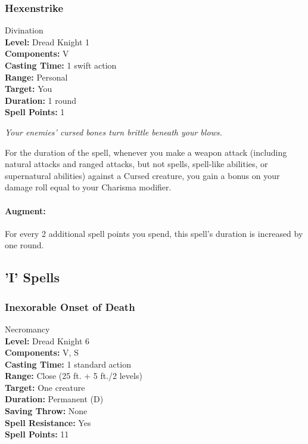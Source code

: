 \subsubsection{Hexenstrike}
\label{Spell:Hexenstrike}
Divination
\\ \textbf{Level:} Dread Knight 1
\\ \textbf{Components:} V
\\ \textbf{Casting Time:} 1 swift action
\\ \textbf{Range:} Personal
\\ \textbf{Target:} You
\\ \textbf{Duration:} 1 round
\\ \textbf{Spell Points:} 1

\emph{Your enemies' cursed bones turn brittle beneath your blows.}

For the duration of the spell, whenever you make a weapon attack (including natural attacks and ranged attacks, but not spells, spell-like abilities, or supernatural abilities) against a Cursed creature, you gain a bonus on your damage roll equal to your Charisma modifier.

\paragraph{Augment:} For every 2 additional spell points you spend, this spell's duration is increased by one round.

\subsection{'I' Spells}

\subsubsection{Inexorable Onset of Death}
\label{Spell:InexorableOnsetOfDeath}
Necromancy
\\ \textbf{Level:} Dread Knight 6
\\ \textbf{Components:} V, S
\\ \textbf{Casting Time:} 1 standard action
\\ \textbf{Range:} Close (25 ft. + 5 ft./2 levels)
\\ \textbf{Target:} One creature
\\ \textbf{Duration:} Permanent (D)
\\ \textbf{Saving Throw:} None
\\ \textbf{Spell Resistance:} Yes
\\ \textbf{Spell Points:} 11

